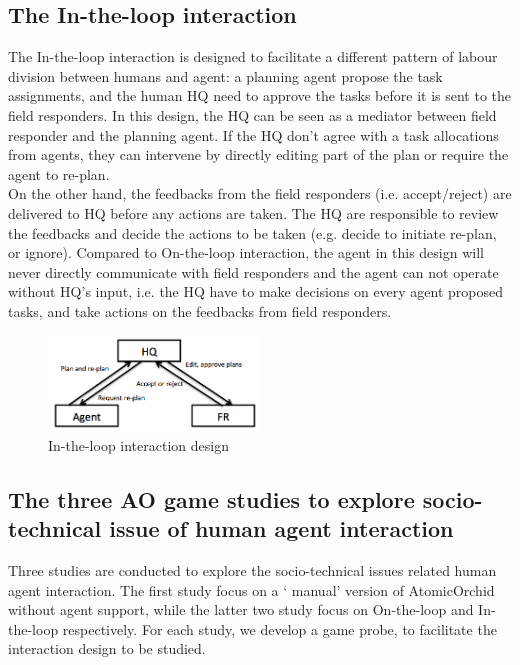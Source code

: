 \subsection{The In-the-loop interaction}
The In-the-loop interaction is designed to facilitate a different pattern of labour division between humans and agent: a planning agent propose the task assignments, and the human HQ need to approve the tasks before it is sent to the field responders. In this design, the HQ can be seen as a mediator between field responder and the planning agent. If the HQ don't agree with a task allocations from agents, they can intervene by directly editing part of the plan or require the agent to re-plan. \\

On the other hand, the feedbacks from the field responders (i.e. accept/reject) are delivered to HQ before any actions are taken. The HQ are responsible to review the feedbacks and decide the actions to be taken (e.g. decide to initiate re-plan, or ignore). Compared to On-the-loop interaction, the agent in this design will never directly communicate with field responders and the agent can not operate without HQ's input, i.e. the HQ have to make decisions on every agent proposed tasks, and take actions on the feedbacks from field responders. \\

\begin{figure}[h]
  \centering
  \includegraphics[width=0.5\textwidth]{img/approach/InTheLoop}
  \caption{In-the-loop interaction design}
  \label{fig:InTheLoop}
\end{figure}


\subsection{The three AO game studies to explore socio-technical issue of human agent interaction}
Three studies are conducted to explore the socio-technical issues related human agent interaction. The first study focus on a ` manual' version of AtomicOrchid without agent support, while the latter two study focus on On-the-loop and In-the-loop respectively. For each study, we develop a game probe, to facilitate the interaction design to be studied. \\ 


